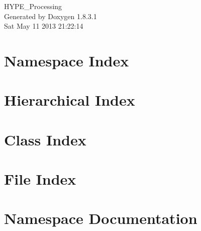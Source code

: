 \documentclass{book}
\begin{document}
\hypersetup{pageanchor=false,citecolor=blue}
\begin{titlepage}
\vspace*{7cm}
\begin{center}
{\Large H\-Y\-P\-E\-\_\-\-Processing }\\
\vspace*{1cm}
{\large Generated by Doxygen 1.8.3.1}\\
\vspace*{0.5cm}
{\small Sat May 11 2013 21:22:14}\\
\end{center}
\end{titlepage}
\clearemptydoublepage
{}
\tableofcontents
\clearemptydoublepage
{}
\hypersetup{pageanchor=true,citecolor=blue}
\chapter{Namespace Index}

\chapter{Hierarchical Index}

\chapter{Class Index}

\chapter{File Index}

\chapter{Namespace Documentation}










\end{document}
